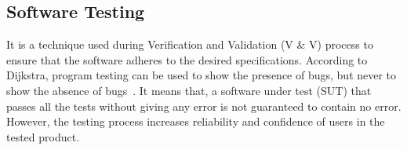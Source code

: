

\subsection{Software Testing} 
It is a technique used during Verification and Validation (V \& V) process to ensure that the software adheres to the desired specifications. According to Dijkstra, program testing can be used to show the presence of bugs, but never to show the absence of bugs~\cite{dahl1972structured}. It means that, a software under test (SUT) that passes all the tests without giving any error is not guaranteed to contain no error. However, the testing process increases reliability and confidence of users in the tested product.

